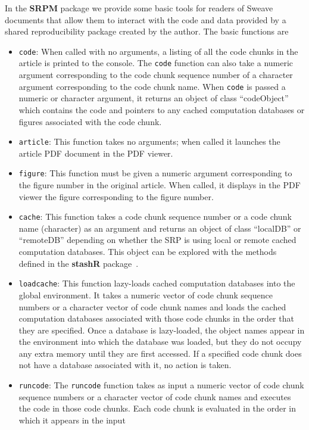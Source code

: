 \documentclass{article}
\newcommand{\code}{\texttt}
\newcommand{\pkg}{\textbf}
\begin{document}
In the \pkg{SRPM} package we provide some basic tools for readers of
Sweave documents that allow them to interact with the code and data
provided by a shared reproducibility package created by the author.
The basic functions are
\begin{itemize}
\item
\code{code}: When called with no arguments, a listing of all the code
chunks in the article is printed to the console.  The \code{code}
function can also take a numeric argument corresponding to the code
chunk sequence number of a character argument corresponding to the
code chunk name.  When \code{code} is passed a numeric or character
argument, it returns an object of class ``codeObject'' which contains
the code and pointers to any cached computation databases or figures
associated with the code chunk.
\item
\code{article}: This function takes no arguments; when called it
launches the article PDF document in the PDF viewer.
\item
\code{figure}: This function must be given a numeric argument
corresponding to the figure number in the original article.  When
called, it displays in the PDF viewer the figure corresponding to the
figure number.
\item
\code{cache}: This function takes a code chunk sequence number or a
code chunk name (character) as an argument and returns an object of
class ``localDB'' or ``remoteDB'' depending on whether the SRP is
using local or remote cached computation databases.  This object can
be explored with the methods defined in the \pkg{stashR}
package~\citep[see also details in][]{ecke:peng:2006}.
\item
\code{loadcache}: This function lazy-loads cached computation
databases into the global environment.  It takes a numeric vector of
code chunk sequence numbers or a character vector of code chunk names
and loads the cached computation databases associated with those code
chunks in the order that they are specified.  Once a database is
lazy-loaded, the object names appear in the environment into which
the database was loaded, but they do not occupy any extra memory
until they are first accessed.  If a specified code chunk does not
have a database associated with it, no action is taken.
\item
\code{runcode}: The \code{runcode} function takes as input a numeric
vector of code chunk sequence numbers or a character vector of code
chunk names and executes the code in those code chunks.  Each code
chunk is evaluated in the order in which it appears in the input

\end{itemize}
\end{document}
